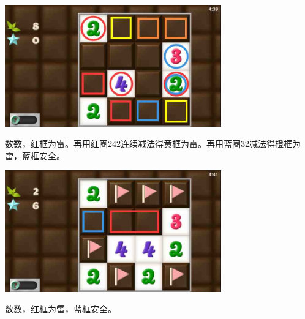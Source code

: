 \subsection{} %
\begin{center}
    \includegraphics[width=0.7\textwidth]{puzzlelow/53-1.jpg}
\end{center}
数数，红框为雷。再用红圈242连续减法得黄框为雷。再用蓝圈32减法得橙框为雷，蓝框安全。
\begin{center}
    \includegraphics[width=0.7\textwidth]{puzzlelow/53-2.jpg}
\end{center}
数数，红框为雷，蓝框安全。

